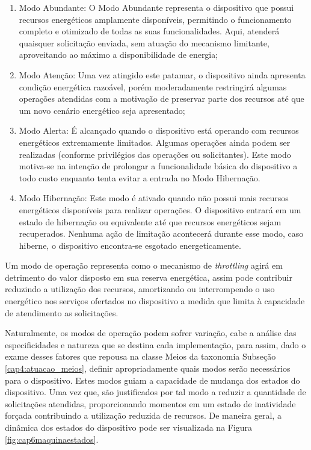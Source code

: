 \begin{enumerate}	
\item Modo Abundante: O Modo Abundante representa o dispositivo que possui recursos energéticos amplamente disponíveis, permitindo o funcionamento completo e otimizado de todas as suas funcionalidades. Aqui, atenderá quaisquer solicitação enviada, sem atuação do mecanismo limitante, aproveitando ao máximo a disponibilidade de energia;
\item Modo Atenção: Uma vez atingido este patamar, o dispositivo ainda apresenta condição energética razoável, porém moderadamente restringirá algumas operações atendidas com a motivação de preservar parte dos recursos até que um novo cenário energético seja apresentado;
\item Modo Alerta: É alcançado quando o dispositivo está operando com recursos energéticos extremamente limitados. Algumas operações ainda podem ser realizadas (conforme privilégios das operações ou solicitantes). Este modo motiva-se na intenção de prolongar a funcionalidade básica do dispositivo a todo custo enquanto tenta evitar a entrada no Modo Hibernação. 
\item Modo Hibernação: Este modo é ativado quando não possui mais recursos energéticos disponíveis para realizar operações. O dispositivo entrará em um estado de hibernação ou equivalente até que recursos energéticos sejam recuperados. Nenhuma ação de limitação acontecerá durante esse modo, caso hiberne,  o dispositivo encontra-se esgotado energeticamente.
\end{enumerate}

Um modo de operação representa como o mecanismo de \textit{throttling} agirá em detrimento do valor disposto em sua reserva energética, assim pode contribuir reduzindo a utilização dos recursos, amortizando ou interrompendo o uso energético nos serviços ofertados no dispositivo a medida que limita à capacidade de atendimento as solicitações. 

Naturalmente, os modos de operação podem sofrer variação, cabe a análise das especificidades e natureza que se destina cada implementação, para assim, dado o exame desses fatores que repousa na classe Meios da taxonomia Subseção \ref{cap4:atuacao_meios}, definir apropriadamente quais modos serão necessários para o dispositivo. Estes modos guiam a capacidade de mudança dos estados do dispositivo. Uma vez que, são justificados por tal modo a reduzir a quantidade de solicitações atendidas, proporcionando momentos em um estado de inatividade forçada contribuindo a utilização reduzida de recursos. De maneira geral, a dinâmica dos estados do dispositivo pode ser visualizada na Figura \ref{fig:cap6maquinaestados}. 

